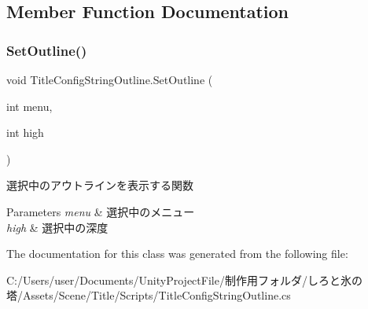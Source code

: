 \subsection{Member Function Documentation}
\mbox{\label{class_title_config_string_outline_a664350bbd4db69b13598eab6e6e431e7}} 
\subsubsection{\texorpdfstring{Set\+Outline()}{SetOutline()}}
{\footnotesize\ttfamily void Title\+Config\+String\+Outline.\+Set\+Outline (\begin{DoxyParamCaption}\item[{int}]{menu,  }\item[{int}]{high }\end{DoxyParamCaption})\hspace{0.3cm}{\ttfamily [inline]}}



選択中のアウトラインを表示する関数 


\begin{DoxyParams}{Parameters}
{\em menu} & 選択中のメニュー\\
\hline
{\em high} & 選択中の深度\\
\hline
\end{DoxyParams}


The documentation for this class was generated from the following file\+:\begin{DoxyCompactItemize}
\item 
C\+:/\+Users/user/\+Documents/\+Unity\+Project\+File/制作用フォルダ/しろと氷の塔/\+Assets/\+Scene/\+Title/\+Scripts/Title\+Config\+String\+Outline.\+cs\end{DoxyCompactItemize}
